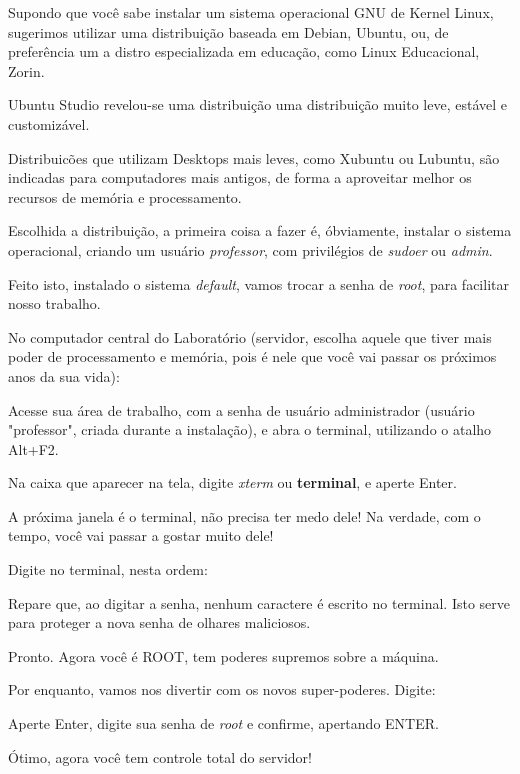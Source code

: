 \begin{multicols}{2}
	\normalsize
	
	Supondo que você sabe instalar um sistema operacional GNU de Kernel Linux, sugerimos utilizar uma distribuição baseada em Debian, Ubuntu, ou, de preferência um a distro especializada em educação, como Linux Educacional, Zorin.
	
	Ubuntu Studio revelou-se uma distribuição uma distribuição muito leve, estável e customizável.
	
	Distribuicões que utilizam Desktops mais leves, como Xubuntu ou Lubuntu, são indicadas para computadores mais antigos, de forma a aproveitar melhor os recursos de memória e processamento.
	
	Escolhida a distribuição, a primeira coisa a fazer é, óbviamente, instalar o sistema operacional, criando um usuário \textit{professor}, com privilégios de \textit{sudoer} ou \textit{admin}.
	
	Feito isto, instalado o sistema \textit{default}, vamos trocar a senha de \textit{root}, para facilitar nosso trabalho.
	
	No computador central do Laboratório (servidor, escolha aquele que tiver mais poder de processamento e memória, pois é nele que você vai passar os próximos anos da sua vida):
	
	Acesse sua área de trabalho, com a senha de usuário administrador (usuário "professor", criada durante a instalação), e abra o terminal, utilizando o atalho Alt+F2.
	
	Na caixa que aparecer na tela, digite \textit{xterm} ou \textbf{terminal}, e aperte Enter.
	
	A próxima janela é o terminal, não precisa ter medo dele! Na verdade, com o tempo, você vai passar a gostar muito dele!
	
	Digite no terminal, nesta ordem:



	Repare que, ao digitar a senha, nenhum caractere é escrito no terminal. Isto serve para proteger a nova senha de olhares maliciosos.
	
	Pronto. Agora você é ROOT, tem poderes supremos sobre a máquina.
	
	Por enquanto, vamos nos divertir com os novos super-poderes. Digite:
	
	
	Aperte Enter, digite sua senha de \textit{root} e confirme, apertando ENTER.
	
	Ótimo, agora você tem controle total do servidor!
	

\end{multicols}
